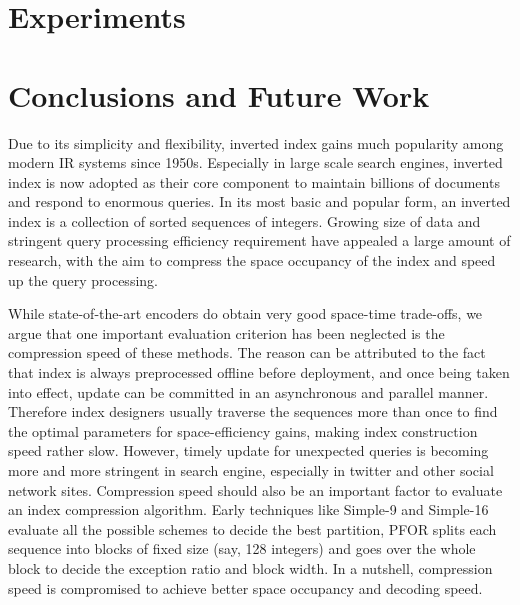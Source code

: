 \documentclass[runningheads,a4paper]{llncs}
\begin{document}
\section{Experiments}
\section{Conclusions and Future Work}

Due to its simplicity and flexibility, inverted index gains much popularity among modern IR systems since 1950s. Especially in large scale search engines, inverted index is now adopted as their core component to maintain billions of documents and respond to enormous queries. In its most basic and popular form, an inverted index is a collection of sorted sequences of integers\cite{manning2008introduction,witten1999managing,zobel2006inverted}. Growing size of data and stringent query processing efficiency requirement have appealed a large amount of research, with the aim to compress the space occupancy of the index and speed up the query processing.

While state-of-the-art encoders do obtain very good space-time trade-offs, we argue that one important evaluation criterion has been neglected is the compression speed of these methods\cite{manning2008introduction,silvestri2010vsencoding,yan2009inverted}. The reason can be attributed to the fact that index is always preprocessed offline before deployment, and once being taken into effect, update can be committed in an asynchronous and parallel manner. Therefore index designers usually traverse the sequences more than once to find the optimal parameters for space-efficiency gains, making index construction speed rather slow. However, timely update for unexpected queries is becoming more and more stringent in search engine, especially in twitter and other social network sites. Compression speed should also be an important factor to evaluate an index compression algorithm. Early techniques like Simple-9 and Simple-16\cite{anh2005inverted,anh2010index} evaluate all the possible schemes to decide the best partition, PFOR\cite{lemire2015decoding,yan2009inverted,zobel2006inverted} splits each sequence into blocks of fixed size (say, 128 integers) and goes over the whole block to decide the exception ratio and block width. In a nutshell, compression speed is compromised to achieve better space occupancy and decoding speed.
\end{document}
